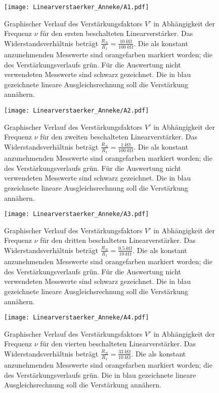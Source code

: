 \begin{figure}[h]
  \centering
  \texttt{[image: Linearverstaerker\_Anneke/A1.pdf]}
  \caption{Graphischer Verlauf des Verstärkungsfaktors $V'$ in Abhängigkeit der Frequenz $\nu$ für den ersten beschalteten Linearverstärker. Das Widerstandsverhältnis beträgt $\frac{R_N}{R_1}=\frac{\SI{10}{k\ohm}}{\SI{100}{k\ohm}}$. Die als konstant anzunehmenden Messwerte sind orangefarben markiert worden; die des Verstärkungsverlaufs grün. Für die Auswertung nicht verwendeten Messwerte sind schwarz gezeichnet. Die in blau gezeichnete lineare Ausgleichsrechnung soll die Verstärkung annähern.}
  \label{linear1}
\end{figure}
\begin{figure}[h]
  \centering
  \texttt{[image: Linearverstaerker\_Anneke/A2.pdf]}
  \caption{Graphischer Verlauf des Verstärkungsfaktors $V'$ in Abhängigkeit der Frequenz $\nu$ für den zweiten beschalteten Linearverstärker. Das Widerstandsverhältnis beträgt $\frac{R_N}{R_1}=\frac{\SI{1}{k\ohm}}{\SI{100}{k\ohm}}$. Die als konstant anzunehmenden Messwerte sind orangefarben markiert worden; die des Verstärkungsverlaufs grün. Für die Auswertung nicht verwendeten Messwerte sind schwarz gezeichnet.  Die in blau gezeichnete lineare Ausgleichsrechnung soll die Verstärkung annähern.}
  \label{linear2}
\end{figure}
\begin{figure}[h]
  \centering
  \texttt{[image: Linearverstaerker\_Anneke/A3.pdf]}
  \caption{Graphischer Verlauf des Verstärkungsfaktors $V'$ in Abhängigkeit der Frequenz $\nu$ für den dritten beschalteten Linearverstärker. Das Widerstandsverhältnis beträgt $\frac{R_N}{R_1}=\frac{\SI{0,5}{k\ohm}}{\SI{10}{k\ohm}}$. Die als konstant anzunehmenden Messwerte sind orangefarben markiert worden; die des Verstärkungsverlaufs grün. Für die Auswertung nicht verwendeten Messwerte sind schwarz gezeichnet.  Die in blau gezeichnete lineare Ausgleichsrechnung soll die Verstärkung annähern.}
  \label{linear3}
\end{figure}
\begin{figure}[h]
  \centering
  \texttt{[image: Linearverstaerker\_Anneke/A4.pdf]}
  \caption{Graphischer Verlauf des Verstärkungsfaktors $V'$ in Abhängigkeit der Frequenz $\nu$ für den vierten beschalteten Linearverstärker. Das Widerstandsverhältnis beträgt $\frac{R_N}{R_1}=\frac{\SI{33}{k\ohm}}{\SI{10}{k\ohm}}$. Die als konstant anzunehmenden Messwerte sind orangefarben markiert worden; die des Verstärkungsverlaufs grün.  Die in blau gezeichnete lineare Ausgleichsrechnung soll die Verstärkung annähern.}
  \label{linear4}
\end{figure}

